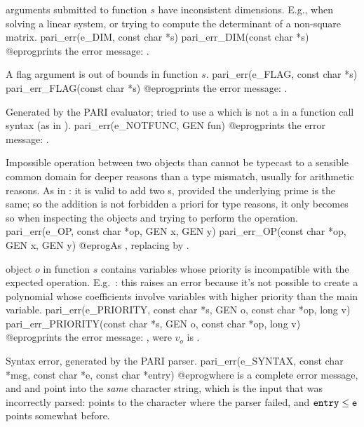  arguments submitted to function $s$ have inconsistent
dimensions. E.g., when solving a linear system, or trying to compute the
determinant of a non-square matrix.
\bprog
  pari_err(e_DIM, const char *s)
  pari_err_DIM(const char *s)
@eprog\noindent prints the error message: .

 A flag argument is out of bounds in function $s$.
\bprog
  pari_err(e_FLAG, const char *s)
  pari_err_FLAG(const char *s)
@eprog\noindent prints the error message: .

 Generated by the PARI evaluator; tried to use a
 which is not a  in a function call syntax (as in
).
\bprog
  pari_err(e_NOTFUNC, GEN fun)
@eprog\noindent prints the error message: .

 Impossible operation between two objects than cannot be
typecast to a sensible common domain for deeper reasons than a type mismatch,
usually for arithmetic reasons. As in : it is valid to add
two s, provided the underlying prime is the same; so the addition
is not forbidden a priori for type reasons, it only becomes so when
inspecting the objects and trying to perform the operation.
\bprog
  pari_err(e_OP, const char *op, GEN x, GEN y)
  pari_err_OP(const char *op, GEN x, GEN y)
@eprog\noindent As , replacing  by
.

 object $o$ in function $s$ contains
variables whose priority is incompatible with the expected operation.
E.g.~: this raises an error because it's not possible to
create a polynomial whose coefficients involve variables with higher priority
than the main variable.
\bprog
  pari_err(e_PRIORITY, const char *s, GEN o, const char *op, long v)
  pari_err_PRIORITY(const char *s, GEN o, const char *op, long v)
@eprog\noindent prints the error message: , were $v_o$ is .

 Syntax error, generated by the PARI parser.
\bprog
  pari_err(e_SYNTAX, const char *msg, const char *e, const char *entry)
@eprog\noindent where  is a complete error message, and  and
 point into the \emph{same} character string, which is the input
that was incorrectly parsed:  points to the character where the parser
failed, and ${\tt entry}\leq {\tt e}$ points somewhat before.

